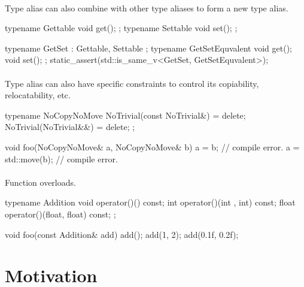 \documentclass{article}
\begin{document}
\paragraph{}
Type alias can also combine with other type aliases to form a new type alias.
\begin{codeblock}
typename Gettable{ void get(); };
typename Settable{ void set(); };

typename GetSet : Gettable, Settable {};
typename GetSetEquvalent {
  void get();
  void set();
};
static_assert(std::is_same_v<GetSet, GetSetEquvalent>);
\end{codeblock}

\paragraph{}
Type alias can also have specific constraints to control its copiability, relocatability, etc.
\begin{codeblock}
typename NoCopyNoMove {
  NoTrivial(const NoTrivial&) = delete;
  NoTrivial(NoTrivial&&) = delete;
};

void foo(NoCopyNoMove& a, NoCopyNoMove& b) {
  a = b; // compile error.
  a = std::move(b); // compile error.
}
\end{codeblock}

\paragraph{}
Function overloads.

\begin{codeblock}
typename Addition {
  void operator()() const;
  int operator()(int , int) const;
  float operator()(float, float) const;
};

void foo(const Addition& add) {
  add();
  add(1, 2);
  add(0.1f, 0.2f);
}
\end{codeblock}

\section{Motivation}
\end{document}
